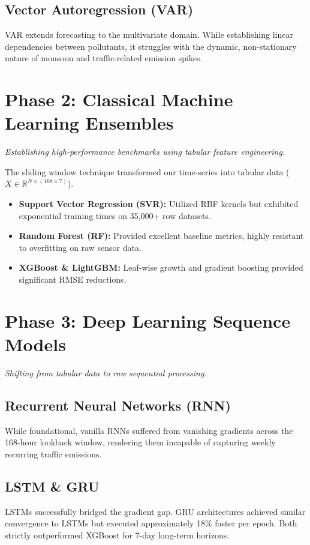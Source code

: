 \documentclass[11pt,a4paper,oneside]{book}
\begin{document}
\section{Vector Autoregression (VAR)}
VAR extends forecasting to the multivariate domain. While establishing linear dependencies between pollutants, it struggles with the dynamic, non-stationary nature of monsoon and traffic-related emission spikes.

\chapter{Phase 2: Classical Machine Learning Ensembles}
\textit{Establishing high-performance benchmarks using tabular feature engineering.}

The sliding window technique transformed our time-series into tabular data ($X \in \mathbb{R}^{N \times (168 \times 7)}$). 
\begin{itemize}
    \item \textbf{Support Vector Regression (SVR):} Utilized RBF kernels but exhibited exponential training times on 35,000+ row datasets.
    \item \textbf{Random Forest (RF):} Provided excellent baseline metrics, highly resistant to overfitting on raw sensor data.
    \item \textbf{XGBoost \& LightGBM:} Leaf-wise growth and gradient boosting provided significant RMSE reductions. 
\end{itemize}

\chapter{Phase 3: Deep Learning Sequence Models}
\textit{Shifting from tabular data to raw sequential processing.}

\section{Recurrent Neural Networks (RNN)}
While foundational, vanilla RNNs suffered from vanishing gradients across the 168-hour lookback window, rendering them incapable of capturing weekly recurring traffic emissions.

\section{LSTM \& GRU}
LSTMs successfully bridged the gradient gap. GRU architectures achieved similar convergence to LSTMs but executed approximately 18\% faster per epoch. Both strictly outperformed XGBoost for 7-day long-term horizons.
\end{document}
